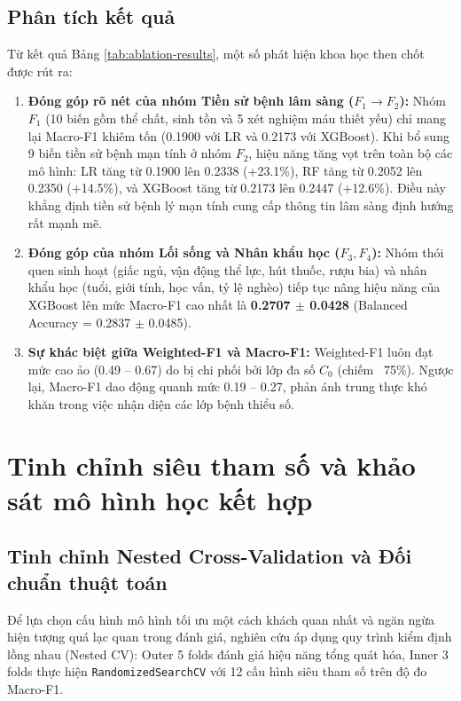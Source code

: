 \subsection{Phân tích kết quả}
Từ kết quả Bảng \ref{tab:ablation-results}, một số phát hiện khoa học then chốt được rút ra:
\begin{enumerate}
    \item \textbf{Đóng góp rõ nét của nhóm Tiền sử bệnh lâm sàng ($F_1 \to F_2$):} Nhóm $F_1$ (10 biến gồm thể chất, sinh tồn và 5 xét nghiệm máu thiết yếu) chỉ mang lại Macro-F1 khiêm tốn (0.1900 với LR và 0.2173 với XGBoost). Khi bổ sung 9 biến tiền sử bệnh mạn tính ở nhóm $F_2$, hiệu năng tăng vọt trên toàn bộ các mô hình: LR tăng từ 0.1900 lên 0.2338 (+23.1\%), RF tăng từ 0.2052 lên 0.2350 (+14.5\%), và XGBoost tăng từ 0.2173 lên 0.2447 (+12.6\%). Điều này khẳng định tiền sử bệnh lý mạn tính cung cấp thông tin lâm sàng định hướng rất mạnh mẽ.
    \item \textbf{Đóng góp của nhóm Lối sống và Nhân khẩu học ($F_3, F_4$):} Nhóm thói quen sinh hoạt (giấc ngủ, vận động thể lực, hút thuốc, rượu bia) và nhân khẩu học (tuổi, giới tính, học vấn, tỷ lệ nghèo) tiếp tục nâng hiệu năng của XGBoost lên mức Macro-F1 cao nhất là \textbf{0.2707 $\pm$ 0.0428} (Balanced Accuracy = 0.2837 $\pm$ 0.0485).
    \item \textbf{Sự khác biệt giữa Weighted-F1 và Macro-F1:} Weighted-F1 luôn đạt mức cao ảo (0.49 -- 0.67) do bị chi phối bởi lớp đa số $C_0$ (chiếm ~75\%). Ngược lại, Macro-F1 dao động quanh mức 0.19 -- 0.27, phản ánh trung thực khó khăn trong việc nhận diện các lớp bệnh thiểu số.
\end{enumerate}

\section{Tinh chỉnh siêu tham số và khảo sát mô hình học kết hợp}
\label{sec:tuning-va-ensemble}

\subsection{Tinh chỉnh Nested Cross-Validation và Đối chuẩn thuật toán}
Để lựa chọn cấu hình mô hình tối ưu một cách khách quan nhất và ngăn ngừa hiện tượng quá lạc quan trong đánh giá, nghiên cứu áp dụng quy trình kiểm định lồng nhau (Nested CV): Outer 5 folds đánh giá hiệu năng tổng quát hóa, Inner 3 folds thực hiện \texttt{RandomizedSearchCV} với 12 cấu hình siêu tham số trên độ đo Macro-F1.

